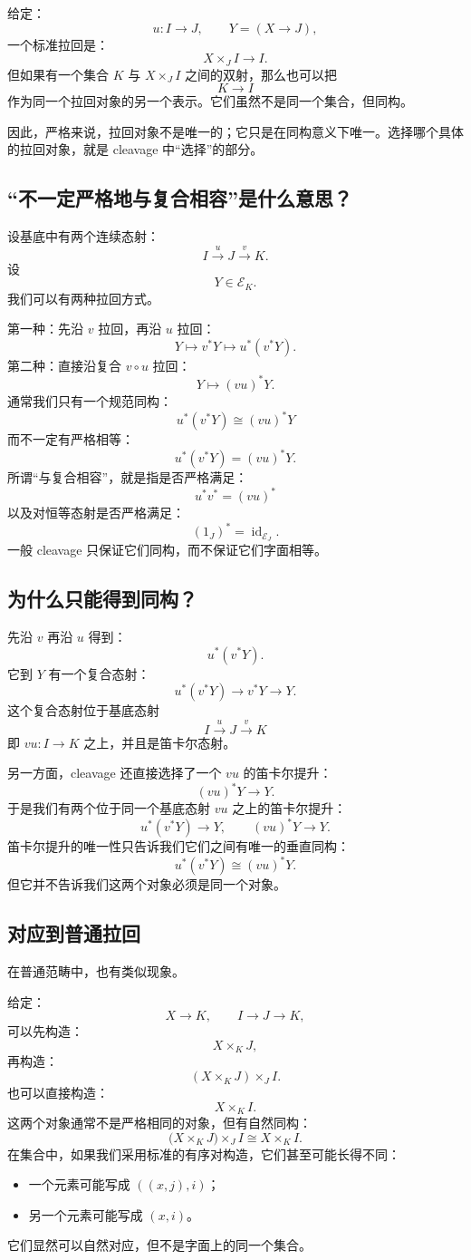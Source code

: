 \documentclass[12pt,a4paper]{article}
\begin{document}
给定：
\[
u:I\to J,
\qquad
Y=(X\to J),
\]
一个标准拉回是：
\[
X\times_J I\to I.
\]
但如果有一个集合 \(K\) 与 \(X\times_J I\) 之间的双射，那么也可以把
\[
K\to I
\]
作为同一个拉回对象的另一个表示。它们虽然不是同一个集合，但同构。

因此，严格来说，拉回对象不是唯一的；它只是在同构意义下唯一。选择哪个具体的拉回对象，就是 cleavage 中“选择”的部分。

\subsection{“不一定严格地与复合相容”是什么意思？}

设基底中有两个连续态射：
\[
I\xrightarrow{u}J\xrightarrow{v}K.
\]
设
\[
Y\in\mathcal{E}_K.
\]
我们可以有两种拉回方式。

第一种：先沿 \(v\) 拉回，再沿 \(u\) 拉回：
\[
Y
\longmapsto
v^*Y
\longmapsto
u^*(v^*Y).
\]
第二种：直接沿复合 \(v\circ u\) 拉回：
\[
Y
\longmapsto
(vu)^*Y.
\]
通常我们只有一个规范同构：
\[
\boxed{
u^*(v^*Y)\cong(vu)^*Y
}
\]
而不一定有严格相等：
\[
u^*(v^*Y)=(vu)^*Y.
\]
所谓“与复合相容”，就是指是否严格满足：
\[
\boxed{
u^*v^*=(vu)^*
}
\]
以及对恒等态射是否严格满足：
\[
\boxed{
(1_J)^*=\operatorname{id}_{\mathcal{E}_J}.
}
\]
一般 cleavage 只保证它们同构，而不保证它们字面相等。

\subsection{为什么只能得到同构？}

先沿 \(v\) 再沿 \(u\) 得到：
\[
u^*(v^*Y).
\]
它到 \(Y\) 有一个复合态射：
\[
u^*(v^*Y)
\longrightarrow
v^*Y
\longrightarrow
Y.
\]
这个复合态射位于基底态射
\[
I\xrightarrow{u}J\xrightarrow{v}K
\]
即 \(vu:I\to K\) 之上，并且是笛卡尔态射。

另一方面，cleavage 还直接选择了一个 \(vu\) 的笛卡尔提升：
\[
(vu)^*Y\to Y.
\]
于是我们有两个位于同一个基底态射 \(vu\) 之上的笛卡尔提升：
\[
u^*(v^*Y)\to Y,
\qquad
(vu)^*Y\to Y.
\]
笛卡尔提升的唯一性只告诉我们它们之间有唯一的垂直同构：
\[
u^*(v^*Y)\cong(vu)^*Y.
\]
但它并不告诉我们这两个对象必须是同一个对象。

\subsection{对应到普通拉回}

在普通范畴中，也有类似现象。

给定：
\[
X\to K,
\qquad
I\to J\to K,
\]
可以先构造：
\[
X\times_K J,
\]
再构造：
\[
(X\times_K J)\times_J I.
\]
也可以直接构造：
\[
X\times_K I.
\]
这两个对象通常不是严格相同的对象，但有自然同构：
\[
\bigl(X\times_K J\bigr)\times_J I
\cong
X\times_K I.
\]
在集合中，如果我们采用标准的有序对构造，它们甚至可能长得不同：
\begin{itemize}
  \item 一个元素可能写成 \(((x,j),i)\)；
  \item 另一个元素可能写成 \((x,i)\)。
\end{itemize}
它们显然可以自然对应，但不是字面上的同一个集合。
\end{document}
